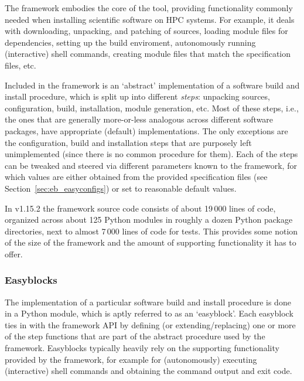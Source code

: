 The \easybuild{} framework embodies the core of the tool,
providing functionality commonly needed when installing scientific software on HPC
systems. For example, it deals with downloading, unpacking, and patching of sources,
loading module files for dependencies, setting up the build enviroment, autonomously
running (interactive) shell commands, creating module files that match the
specification files, etc.

Included in the framework is an `abstract' implementation of a software build and
install procedure, which is split up into different \emph{steps}: unpacking sources,
configuration, build, installation, module generation, etc. Most of these steps,
i.e., the ones that are generally more-or-less analogous across
different software packages, have appropriate (default) implementations. The only
exceptions are the configuration, build and installation steps that are purposely
left unimplemented (since there is no common procedure for them). Each of the steps
can be tweaked and steered via different parameters known to the framework, for
which values are either obtained from the provided specification files (see
Section~\ref{sec:eb_easyconfigs}) or set to reasonable default values.

In \easybuild{} v1.15.2 the framework source code consists of about 19\,000 lines
of code, organized across about 125 Python modules in roughly a dozen Python
package directories, next to almost 7\,000 lines of code for tests. This provides some
notion of the size of the \easybuild{} framework and the amount of supporting
functionality it has to offer.

\subsubsection{Easyblocks}
\label{sec:eb_easyblocks}

The implementation of a particular software build and install procedure is done in
a Python module, which is aptly referred to as an `easyblock'. Each easyblock
ties in with the framework API by defining (or extending/replacing) one or more of
the step functions that are part of the abstract procedure used by the
\easybuild{} framework. Easyblocks typically heavily rely on the supporting
functionality provided by the framework, for example for (autonomously)
executing (interactive) shell commands and obtaining the command output and
exit code.

